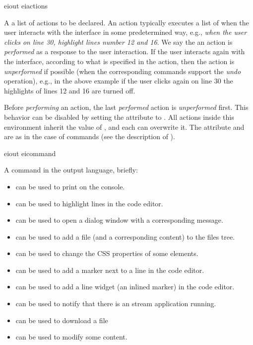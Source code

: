 \bigskip
\xmlstruct
{eiout}
{eiactions}
{%
%
  A a list of actions to be declared. An action typically executes a
  list of  when the user interacts with the
  interface in some predetermined way, e.g., \emph{when the user
    clicks on line 30, highlight lines number 12 and 16}. We say the
  an action is \emph{performed} as a response to the user interaction.
%
  If the user interacts again with the interface, according to what is
  specified in the action, then the action is \emph{unperformed} if
  possible (when the corresponding commands support the \emph{undo}
  operation), e.g., in the above example if the user clicks again on
  line 30 the highlights of lines 12 and 16 are turned off.

  Before \emph{performing} an action, the last \emph{performed} action
  is \emph{unperformed} first. This behavior can be disabled by
  setting the  attribute to
  . All actions inside this environment
  inherit the value of , and each can
  overwrite it.
% 
  The attribute  and  are
  as in the case of commands (see the description of
  ).
%
}


\bigskip
\xmlstruct
{eiout}
{eicommand}
{
A command in the \ei output language, briefly:
\begin{itemize}
\item {} can be used to print on the console.
%
\item {} can be used to highlight
  lines in the code editor.
%
\item {} can be used to open a dialog
  window with a corresponding message.
%
\item {} can be used to add a file (and a
  corresponding content) to the files tree.
%
\item {} can be used to change the CSS
  properties of some elements.
%
\item {} can be used to add a marker next
  to a line in the code editor.
%
\item {} can be used to add a line
  widget (an inlined marker) in the code editor.
%
\item {} can be used to notify that
  there is an stream application running.
%
\item {} can be used to download a file
%
\item {} can be used to modify some content.
%
\end{itemize}
}


